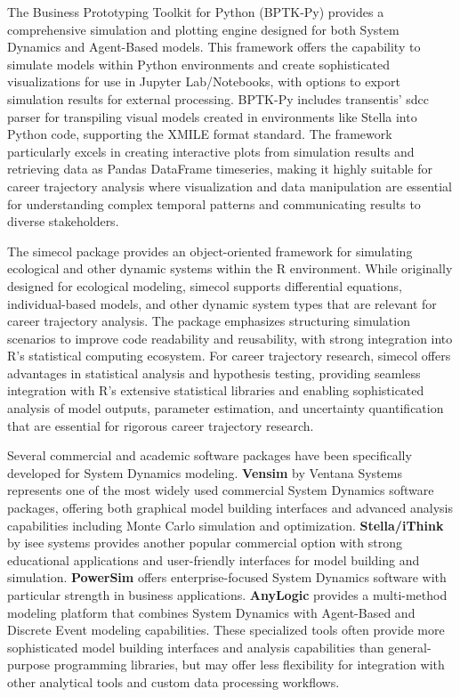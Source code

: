\documentclass[main.tex]{subfiles}
\begin{document}

The Business Prototyping Toolkit for Python (BPTK-Py) provides a comprehensive simulation and plotting engine designed for both System Dynamics and Agent-Based models\parencite{bptk_py}. This framework offers the capability to simulate models within Python environments and create sophisticated visualizations for use in Jupyter Lab/Notebooks, with options to export simulation results for external processing. BPTK-Py includes transentis' sdcc parser for transpiling visual models created in environments like Stella into Python code, supporting the XMILE format standard. The framework particularly excels in creating interactive plots from simulation results and retrieving data as Pandas DataFrame timeseries, making it highly suitable for career trajectory analysis where visualization and data manipulation are essential for understanding complex temporal patterns and communicating results to diverse stakeholders.


The simecol package provides an object-oriented framework for simulating ecological and other dynamic systems within the R environment\parencite{simecol}. While originally designed for ecological modeling, simecol supports differential equations, individual-based models, and other dynamic system types that are relevant for career trajectory analysis. The package emphasizes structuring simulation scenarios to improve code readability and reusability, with strong integration into R's statistical computing ecosystem. For career trajectory research, simecol offers advantages in statistical analysis and hypothesis testing, providing seamless integration with R's extensive statistical libraries and enabling sophisticated analysis of model outputs, parameter estimation, and uncertainty quantification that are essential for rigorous career trajectory research.


Several commercial and academic software packages have been specifically developed for System Dynamics modeling. \textbf{Vensim} by Ventana Systems represents one of the most widely used commercial System Dynamics software packages, offering both graphical model building interfaces and advanced analysis capabilities including Monte Carlo simulation and optimization. \textbf{Stella/iThink} by isee systems provides another popular commercial option with strong educational applications and user-friendly interfaces for model building and simulation. \textbf{PowerSim} offers enterprise-focused System Dynamics software with particular strength in business applications. \textbf{AnyLogic} provides a multi-method modeling platform that combines System Dynamics with Agent-Based and Discrete Event modeling capabilities. These specialized tools often provide more sophisticated model building interfaces and analysis capabilities than general-purpose programming libraries, but may offer less flexibility for integration with other analytical tools and custom data processing workflows.
\end{document}
